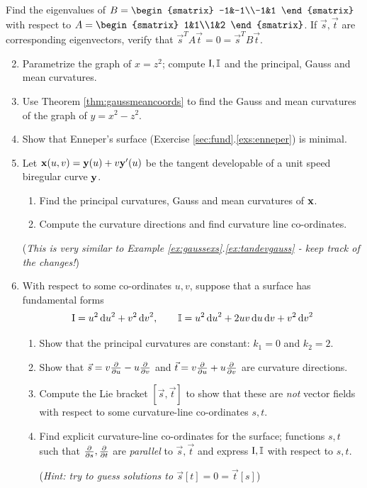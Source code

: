 \begin{exercises}{}{}
	\exstart Find the eigenvalues of $B=
	\begin{smatrix}
		-1&-1\\-1&1
	\end{smatrix}$
	with respect to $A=
	\begin{smatrix}
		1&1\\1&2
	\end{smatrix}$.
	If $\vec s,\vec t$ are corresponding eigenvectors, verify that $\vec s^TA\vec t=0=\vec s^TB\vec t$.


	\begin{enumerate}\setcounter{enumi}{1}
	  \item Parametrize the graph of $x=z^2$; compute $\mathrm{I},\mathbb{I}$ and the principal, Gauss and mean curvatures.
	  
	  
	  \item Use Theorem \ref{thm:gaussmeancoords} to find the Gauss and mean curvatures of the graph of $y=x^2-z^2$.
	  
	  
	  \item Show that Enneper's surface (Exercise \ref*{sec:fund}.\ref{exs:enneper}) is minimal.
	    
	
	  \item\label{exs:tandevcurv} Let ${\mathbf{x}}(u,v)={\mathbf{y}}(u)+v{\mathbf{y}}'(u)$ be the tangent developable of a unit speed biregular curve ${\mathbf{y}}$.
	  \begin{enumerate}
	    \item Find the principal curvatures, Gauss and mean curvatures of ${\mathbf{x}}$.
			\item Compute the curvature directions and find curvature line co-ordinates.
		\end{enumerate}
		(\emph{This is very similar to Example \ref*{ex:gaussexs}.\ref{ex:tandevgauss} - keep track of the changes!})
		
		
		\item With respect to some co-ordinates $u,v$, suppose that a surface has fundamental forms
		\[
			\mathrm{I}=u^2\,{\mathrm{d} u}^2+v^2\,{\mathrm{d} v}^2,\qquad \mathbb{I}=u^2\,{\mathrm{d} u}^2+2uv\,{\mathrm{d} u}\,{\mathrm{d} v}+v^2\,{\mathrm{d} v}^2
		\]
		
		\begin{enumerate}
		  \item Show that the principal curvatures are constant: $k_1=0$ and $k_2=2$.
		  \item Show that $\vec s= v\frac{\partial }{\partial u}-u\frac{\partial }{\partial v}$ and $\vec t=v\frac{\partial }{\partial u}+u\frac{\partial }{\partial v}$ are curvature directions.
		  \item Compute the Lie bracket $[\vec s,\vec t]$ to show that these are \emph{not} vector fields with respect to some curvature-line co-ordinates $s,t$.
		  \item Find explicit curvature-line co-ordinates for the surface; functions $s,t$ such that $\frac{\partial }{\partial s},\frac{\partial }{\partial t}$ are \emph{parallel} to $\vec s,\vec t$ and express $\mathrm{I},\mathbb{I}$ with respect to $s,t$.\par
		  (\emph{Hint: try to guess solutions to $\vec s[t]=0=\vec t[s]$})
		\end{enumerate}
		

\end{enumerate}
\end{exercises}

